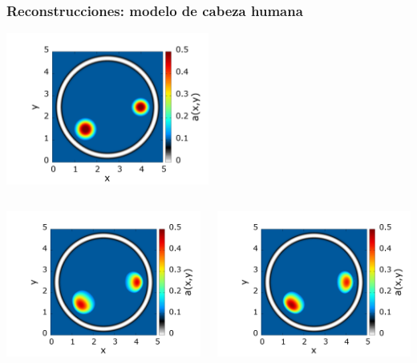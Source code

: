 \begin{frame}
\frametitle{Reconstrucciones: modelo de cabeza humana}

\centering
  \includegraphics[width=0.5\textwidth]{figuras/head_true.png}

\vspace{-0.04\textheight}
\begin{columns}[t]  
\begin{column}{0.5\textwidth}
  \includegraphics[width=1.0\textwidth]{figuras/head_sweep.png}
\end{column} 
\begin{column}{0.5\textwidth}
  \includegraphics[width=1.0\textwidth]{figuras/head_ours.png}
\end{column} 
\end{columns} 

\end{frame}


